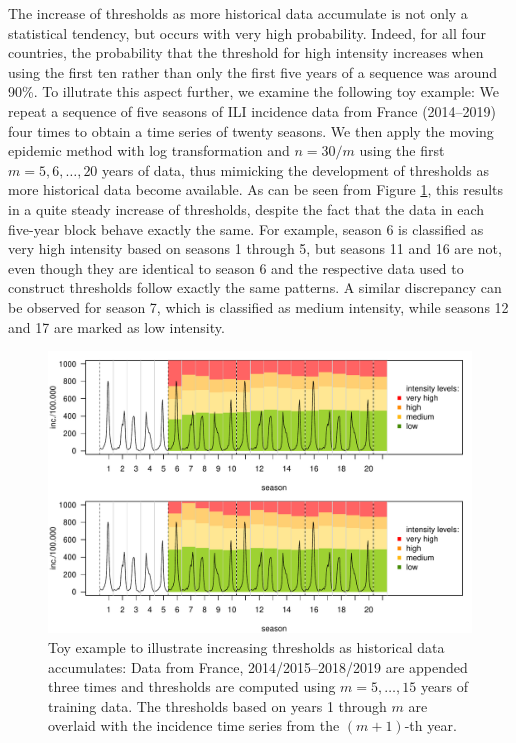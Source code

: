 \documentclass{article}
\begin{document}
The increase of thresholds as more historical data accumulate is not only a statistical tendency, but occurs with very high probability. Indeed, for all four countries, the probability that the threshold for high intensity increases when using the first ten rather than only the first five years of a sequence was around 90\%. To illutrate this aspect further, we examine the following toy example: We repeat a sequence of five seasons of ILI incidence data from France (2014--2019) four times to obtain a time series of twenty seasons. We then apply the moving epidemic method with log transformation and $n = 30/m$ using the first $m = 5, 6, \dots, 20$ years of data, thus mimicking the development of thresholds as more historical data become available. As can be seen from Figure \ref{fig:example_france}, this results in a quite steady increase of thresholds, despite the fact that the data in each five-year block behave exactly the same. For example, season 6 is classified as very high intensity based on seasons 1 through 5, but seasons 11 and 16 are not, even though they are identical to season 6 and the respective data used to construct thresholds follow exactly the same patterns. A similar discrepancy can be observed for season 7, which is classified as medium intensity, while seasons 12 and 17 are marked as low intensity.

\begin{figure}
\center
\includegraphics[scale=0.6]{figure/example_france.pdf}
\caption{Toy example to illustrate increasing thresholds as historical data accumulates: Data from France, 2014/2015--2018/2019 are appended three times and thresholds are computed using $m = 5, \dots, 15$ years of training data. The thresholds based on years 1 through $m$ are overlaid with the incidence time series from the $(m + 1)$-th year.}
\label{fig:example_france}
\end{figure}
\end{document}
